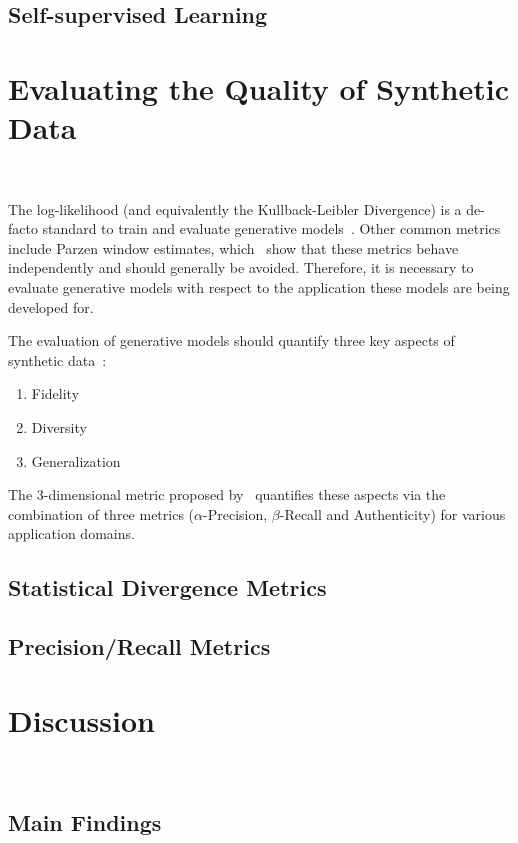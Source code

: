 \documentclass[parskip=full]{scrartcl}
\begin{document}
\subsection{Self-supervised Learning}

\section{Evaluating the Quality of Synthetic Data
}~\label{sec:evaluating-synthetic-data}

The log-likelihood (and equivalently the Kullback-Leibler Divergence) is a
de-facto standard to train and evaluate generative
models~\cite{theis2016note}. Other common metrics include Parzen window
estimates, which~\citet{theis2016note} show that these metrics behave
independently and should generally be avoided. Therefore, it is necessary
to evaluate generative models with respect to the application these models are
being developed for.


The evaluation of generative models should quantify three key aspects of
synthetic data~\cite{alaa2022faithful}:

\begin{enumerate}
    \item Fidelity
    \item Diversity 
    \item Generalization
\end{enumerate}

The 3-dimensional metric proposed by~\citet{alaa2022faithful} quantifies these
aspects via the combination of three metrics ($\alpha$-Precision,
$\beta$-Recall and Authenticity) for various application domains.

\subsection{Statistical Divergence Metrics} 

\subsection{Precision/Recall Metrics}

\section{Discussion}~\label{sec:discussion}

\subsection{Main Findings}
\end{document}
